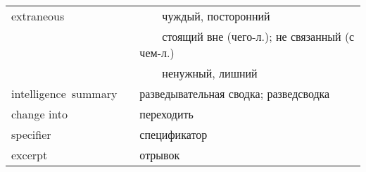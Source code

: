 \documentclass[14pt,a4paper]{article}
\newcommand{\tabitem}{~~\llap{\textbullet}~~}
\begin{document}
{
\linespread{3}
\renewcommand\arraystretch{1}

\fontsize{12pt}{5.5pt}\selectfont
{}\selectfont

\begin{tabularx}{\textwidth}{| m{4cm} | m{3cm} | X |}
 \hline
extraneous & & \tabitem чуждый, посторонний\\
& & \tabitem стоящий вне (чего-л.); не связанный (с чем-л.)\\
& & \tabitem ненужный, лишний\\ \hline 
 intelligence~summary & & разведывательная сводка; разведсводка\\ \hline
 change into & & переходить\\ \hline
 specifier & & спецификатор\\ \hline
 excerpt & & отрывок\\ \hline 

\end{tabularx}}
\end{document}
